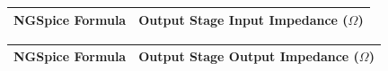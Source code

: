 \begin{table}[H] \centering
  \begin{tabular}{|l|r|}
    \hline    
    {\bf NGSpice Formula} & {\bf Output Stage Input Impedance ($\Omega$)}\\ \hline
    
  \end{tabular}
 \label{tab:inputimp2}
\end{table}

\begin{table}[H] \centering
  \begin{tabular}{|l|r|}
    \hline    
    {\bf NGSpice Formula} & {\bf Output Stage Output Impedance ($\Omega$)}\\ \hline
    
  \end{tabular}
 \label{tab:outimp2}
\end{table}


\pagebreak
